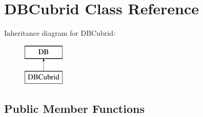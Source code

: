 \hypertarget{classDBCubrid}{\section{D\+B\+Cubrid Class Reference}
\label{classDBCubrid}
}
Inheritance diagram for D\+B\+Cubrid\+:\begin{figure}[H]
\begin{center}
\leavevmode
\includegraphics[height=2.000000cm]{classDBCubrid}
\end{center}
\end{figure}
\subsection*{Public Member Functions}
